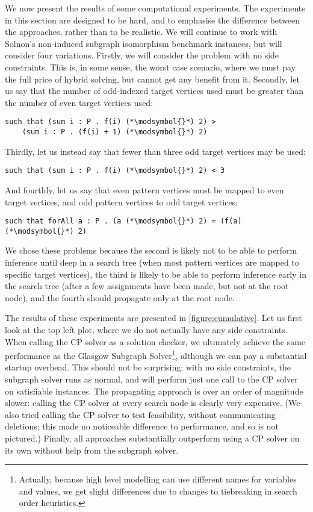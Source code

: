 \documentclass[runningheads]{llncs}
\begin{document}
We now present the results of some computational experiments. The experiments in this section are
designed to be hard, and to emphasise the difference between the approaches, rather
than to be realistic. We will continue to work with Solnon's non-induced subgraph isomorphism
benchmark instances, but will consider four variations. Firstly, we will consider the problem with
no side constraints. This is, in some sense, the worst case scenario, where we must pay the full
price of hybrid solving, but cannot get any benefit from it. Secondly, let us say that the number of
odd-indexed target vertices used must be greater than the number of even target vertices used:
\newcommand{\modsymbol}{\%}
\begin{lstlisting}
such that (sum i : P . f(i) (*\modsymbol{}*) 2) >
    (sum i : P . (f(i) + 1) (*\modsymbol{}*) 2)
\end{lstlisting}
Thirdly, let us instead say that fewer than three odd target vertices may be used:
\begin{lstlisting}
such that (sum i : P . f(i) (*\modsymbol{}*) 2) < 3
\end{lstlisting}
And fourthly, let us say that even pattern vertices must be mapped to even target vertices, and odd
pattern vertices to odd target vertices:
\begin{lstlisting}
such that forAll a : P . (a (*\modsymbol{}*) 2) = (f(a) (*\modsymbol{}*) 2)
\end{lstlisting}

We chose these problems because the second is likely not to be able to
perform inference until deep in a search tree (when most pattern vertices are mapped to specific
target vertices), the third is likely to be able to perform inference early in the search tree
(after a few assignments have been made, but not at the root node), and the fourth should propagate
only at the root node.

The results of these experiments are presented in \cref{figure:cumulative}. Let us first look at the
top left plot, where we do not actually have any side constraints. When calling the CP solver as a
solution checker, we ultimately achieve the same performance as the Glasgow Subgraph
Solver\footnote{Actually, because high level modelling can use different names for variables and
values, we get slight differences due to changes to tiebreaking in search order heuristics.},
although we can pay a substantial startup overhead. This should not be surprising: with no side
constraints, the subgraph solver runs as normal, and will perform just one call to the CP solver on
satisfiable instances. The propagating approach is over an order of magnitude slower: calling the CP
solver at every search node is clearly very expensive. (We also tried calling the CP solver to test
feasibility, without communicating deletions; this made no noticeable difference to performance, and
so is not pictured.) Finally, all approaches substantially outperform using a CP solver on its own
without help from the subgraph solver.
\end{document}
